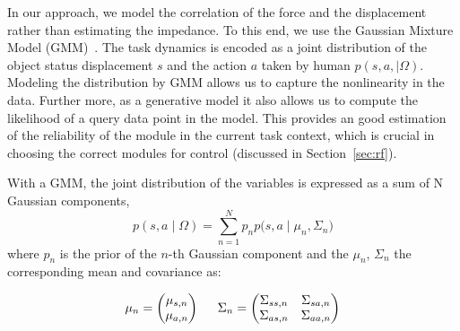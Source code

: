 \documentclass[preprint,12pt]{elsarticle}
\begin{document}
In our approach, we model the correlation of the force and the displacement rather than estimating the impedance. To this end, we use the Gaussian Mixture Model (GMM)~\cite{cohn1996active}. The task dynamics is encoded as a joint distribution of the object status displacement $s$ and the action $a$ taken by human $p(s,a,{\mid}{\Omega})$.
Modeling the distribution by GMM allows us to capture the nonlinearity in the data. Further more, as a generative model it also allows us to compute the likelihood of a query data point in the model. This provides an good estimation of the reliability of the module in the current task context, which is crucial in choosing the correct modules for control (discussed in Section~\ref{sec:rf}).

With a GMM, the joint distribution of the variables is expressed as a sum of N Gaussian components,
\begin{equation}
{
p(s,a\mid\Omega)
= \sum_{n=1}^N {p_{n}p(s,a\mid{\mu}_n},{\Sigma}_n)
}
\end{equation}
where $p_n$ is the prior of the $n$-th Gaussian component and the ${\mu}_n$, ${\Sigma}_n$ the corresponding mean and covariance as:

\begin{equation}
{
{\mu}_n = \begin{pmatrix}    {\mu}_{s,n}     \\
                             {\mu}_{a,n}          \\
                    \end{pmatrix}
\hspace{0.2in}
{\Sigma}_n = \begin{pmatrix}     {\Sigma}_{ss,n}  &
                                 {\Sigma}_{sa,n} \\
                                 {\Sigma}_{as,n}  &
                                 {\Sigma}_{aa,n}   \\

                        \end{pmatrix}
}
\end{equation}

\end{document}
